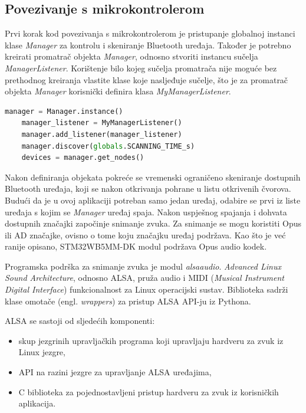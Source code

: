 \subsection{Povezivanje s mikrokontrolerom}

Prvi korak kod povezivanja s mikrokontrolerom je pristupanje globalnoj instanci klase \textit{Manager} za kontrolu i skeniranje Bluetooth uređaja. Također je potrebno kreirati promatrač objekta \textit{Manager}, odnosno stvoriti instancu sučelja \textit{ManagerListener}. Korištenje bilo kojeg sučelja promatrača nije moguće bez prethodnog kreiranja vlastite klase koje nasljeđuje sučelje, što je za promatrač objekta \textit{Manager} korisnički definira klasa \textit{MyManagerListener}. 

\begin{lstlisting}[language=Python, caption={Pristup instanci \textit{Manager} i skeniranje Bluetooth uređaja}]
	manager = Manager.instance()
	manager_listener = MyManagerListener()
	manager.add_listener(manager_listener)
	manager.discover(globals.SCANNING_TIME_s)
	devices = manager.get_nodes()
\end{lstlisting}

Nakon definiranja objekata pokreće se vremenski ograničeno skeniranje dostupnih Bluetooth uređaja, koji se nakon otkrivanja pohrane u listu otkrivenih čvorova. Budući da je u ovoj aplikaciji potreban samo jedan uređaj, odabire se prvi iz liste uređaja s kojim se \textit{Manager} uređaj spaja. Nakon uspješnog spajanja i dohvata dostupnih značajki započinje snimanje zvuka. Za snimanje se mogu koristiti Opus ili AD značajke, ovisno o tome koju značajku uređaj podržava. Kao što je već ranije opisano, STM32WB5MM-DK modul podržava Opus audio kodek.

Programska podrška za snimanje zvuka je modul \textit{alsaaudio}. \textit{Advanced Linux Sound Architecture}, odnosno ALSA, pruža audio i MIDI (\textit{Musical Instrument Digital Interface}) funkcionalnost za Linux operacijski sustav. Biblioteka sadrži klase omotače (engl. \textit{wrappers}) za pristup ALSA API-ju iz Pythona. \cite{alsaaudio}

ALSA se sastoji od sljedećih komponenti:
\begin{itemize}
	\item skup jezgrinih upravljačkih programa koji upravljaju hardveru za zvuk iz Linux jezgre,
	\item API na razini jezgre za upravljanje ALSA uređajima, 
	\item C biblioteka za pojednostavljeni pristup hardveru za zvuk iz korisničkih aplikacija. 
\end{itemize}

